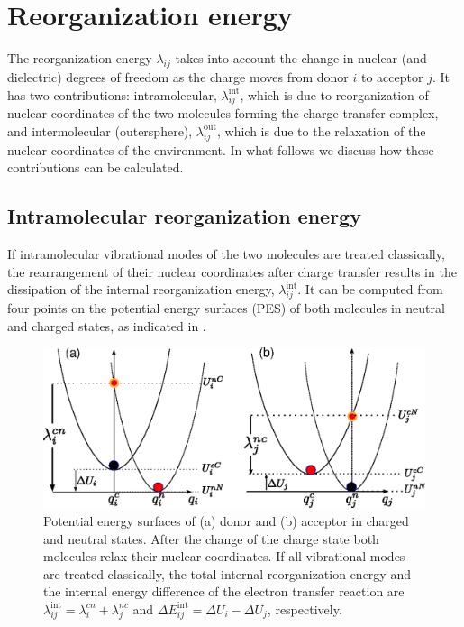 \section{Reorganization energy}
\label{sec:reorganization}

The reorganization energy $\lambda_{ij}$ takes into account the change in  nuclear (and dielectric) degrees of freedom as the charge moves from donor $i$ to acceptor $j$. It has two contributions: intramolecular, $\lambda^\text{int}_{ij}$, which is due to reorganization of nuclear coordinates of the two molecules forming the charge transfer complex, and intermolecular (outersphere), $\lambda^\text{out}_{ij}$, which is due to the relaxation of the nuclear coordinates of the environment. In what follows we discuss how these contributions can be calculated.

\subsection{Intramolecular reorganization energy}
\label{sec:reorganization}
If intramolecular vibrational modes of the two molecules are treated classically, the rearrangement of their nuclear coordinates after charge transfer results in the dissipation of the internal reorganization energy, $\lambda_{ij}^\text{int}$. It can be computed from four points on the potential energy surfaces (PES) of both molecules in neutral and charged states, as indicated in . 

\begin{figure}
   \centering
   \includegraphics[width=0.6\linewidth]{fig/reorganization_energy/monomer_parabolas}
    \caption{Potential energy surfaces of (a) donor and (b) acceptor in charged and neutral states. After the change of the charge state both molecules relax their nuclear coordinates. If all vibrational modes are treated classically, the total internal reorganization energy and the internal energy difference of the electron transfer reaction are $\lambda_{ij}^\text{int} = \lambda_{i}^{cn} + \lambda_{j}^{nc}$ and $\Delta E_{ij}^\text{int} =  \Delta U_i - \Delta U_j$, respectively.}
   \label{fig:parabolas}
\end{figure}



